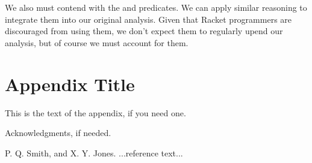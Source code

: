 \documentclass{sigplanconf}
\begin{document}
We also must contend with the  and  predicates. We can apply similar reasoning to integrate them into our original analysis.
Given that Racket programmers are discouraged from using them, we don't expect them to regularly upend our analysis, but of course we must account for them.





\appendix
\section{Appendix Title}

This is the text of the appendix, if you need one.

\acks

Acknowledgments, if needed.





\begin{thebibliography}{}
\softraggedright

P. Q. Smith, and X. Y. Jones. ...reference text...

\end{thebibliography}
\end{document}

